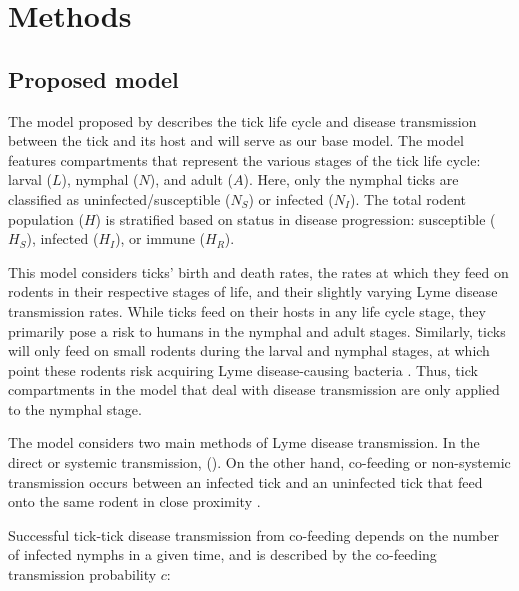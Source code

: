 \documentclass[12pt, centerh1]{article}
\begin{document}
\section{Methods}

\subsection{Proposed model}
The model proposed by \citet{tosato2021host} describes the tick life cycle and disease transmission between the tick and its host and will serve as our base model. The model features compartments that represent the various stages of the tick life cycle: larval ($L$), nymphal ($N$), and adult ($A$). Here, only the nymphal ticks are classified as uninfected/susceptible ($N_S$) or infected ($N_I$). The total rodent population ($H$) is stratified based on status in disease progression: susceptible ($H_S$), infected ($H_I$), or immune ($H_R$).

This model considers ticks' birth and death rates, the rates at which they feed on rodents in their respective stages of life, and their slightly varying Lyme disease transmission rates. While ticks feed on their hosts in any life cycle stage, they primarily pose a risk to humans in the nymphal and adult stages. Similarly, ticks will only feed on small rodents during the larval and nymphal stages, at which point these rodents risk acquiring Lyme disease-causing bacteria \citep{borrelia_shapiro}. Thus, tick compartments in the model that deal with disease transmission are only applied to the nymphal stage.

The model considers two main methods of Lyme disease transmission. In the direct or systemic transmission, (). On the other hand, co-feeding or non-systemic transmission occurs between an infected tick and an uninfected tick that feed onto the same rodent in close proximity \citep{voordouw2015co}. 



Successful tick-tick disease transmission from co-feeding depends on the number of infected nymphs in a given time, and is described by the co-feeding transmission probability $c$: 
\end{document}
